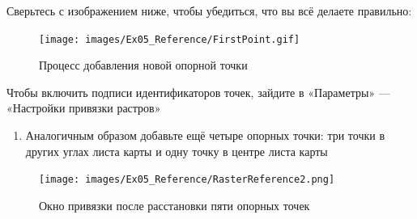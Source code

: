 \documentclass[
  12pt,
]{book}
\providecommand{\tightlist}{%
  \setlength{\itemsep}{0pt}\setlength{\parskip}{0pt}}
\begin{document}
Сверьтесь с изображением ниже, чтобы убедиться, что вы всё делаете правильно:

\begin{figure}
\centering
\texttt{[image: images/Ex05\_Reference/FirstPoint.gif]}
\caption{Процесс добавления новой опорной точки}
\end{figure}

Чтобы включить подписи идентификаторов точек, зайдите в «Параметры» --- «Настройки привязки растров»

\begin{enumerate}
\def\labelenumi{\arabic{enumi}.}
\setcounter{enumi}{7}
\tightlist
\item
  Аналогичным образом добавьте ещё четыре опорных точки: три точки в других углах листа карты и одну точку в центре листа карты
\end{enumerate}

\begin{figure}
\centering
\texttt{[image: images/Ex05\_Reference/RasterReference2.png]}
\caption{Окно привязки после расстановки пяти опорных точек}
\end{figure}
\end{document}
